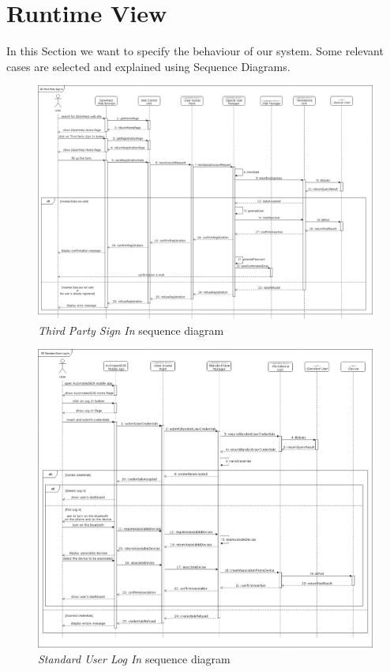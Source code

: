 \clearpage

\section{Runtime View}
In this Section we want to specify the behaviour of our system. Some relevant cases are selected and explained using Sequence Diagrams.

\begin{figure}[H]
  \begin{center}
  	\includegraphics[width=\textwidth]{./img/sequence/webSignIn.png}
    \hspace{0.05\linewidth}
    \centering
    \caption{\textit{Third Party Sign In} sequence diagram}
		\label{img:webSignIn}
    \end{center}
\end{figure}

\begin{figure}[H]
  \begin{center}
  	\includegraphics[width=\textwidth]{./img/sequence/appLogIn.png}
    \hspace{0.05\linewidth}
    \centering
    \caption{\textit{Standard User Log In} sequence diagram}
		\label{img:appLogIn}
    \end{center}
\end{figure}

